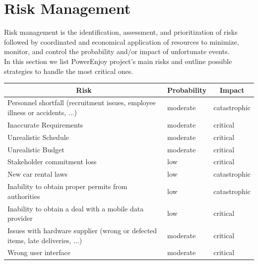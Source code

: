 \documentclass[english]{article}
\begin{document}
\newpage
\section{Risk Management}
Risk management is the identification, assessment, and prioritization of risks followed by coordinated and economical application of resources to minimize, monitor, and control the probability and/or impact of unfortunate events.\\
In this section we list PowerEnjoy project's main risks and outline possible strategies to handle the most critical ones.


\begin{center}
	\begin{tabular}{|p{7cm}|p{2cm}|p{2cm}|}
		\hline
		\multicolumn{1}{|c|}{\textbf{Risk}} & \multicolumn{1}{c|}{\textbf{Probability}} & \multicolumn{1}{c|}{\textbf{Impact}} \\
		\hline
		Personnel shortfall (recruitment issues, employee illness or accidents, ...)& moderate & catastrophic\\
		\hline
		Inaccurate Requirements & moderate & critical\\
		\hline
		Unrealistic Schedule & moderate & critical\\
		\hline
		Unrealistic Budget & moderate & critical\\
		\hline
		Stakeholder commitment loss & low & critical\\
		\hline
		New car rental laws & low & catastrophic \\
		\hline
		Inability to obtain proper permits from authorities  & low & catastrophic \\
		\hline
		Inability to obtain a deal with a mobile data provider  & low & critical \\
		\hline		
		Issues with hardware supplier (wrong or defected items, late deliveries, ...) & moderate & critical \\
		\hline
		Wrong user interface & moderate & critical\\
		\hline
	\end{tabular}
\end{center}

\paragraph{}
\end{document}
